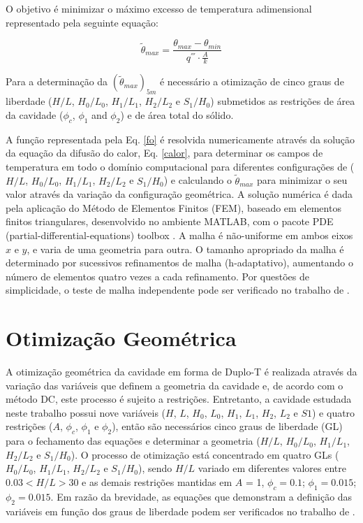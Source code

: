 \documentclass[12pt,A4,A4pt]{article}
\begin{document}
O objetivo é minimizar o máximo excesso de temperatura adimensional representado pela seguinte equação:

\begin{equation}
\tilde{\theta}_{max}=\frac{\theta_{max}-\theta_{min}}{q^{'''}\cdot\frac{A}{k}}\label{fo}
\end{equation}

Para a determinação da $(\tilde{\theta}_{max})_{5m}$ é necessário a otimização de cinco graus de liberdade ($H/L$, $H_{0}/L_{0}$, $H_{1}/L_{1}$, $H_{2}/L_{2}$ e $S_{1}/H_{0}$) submetidos as restrições de área da cavidade ($\phi_{c}$, $\phi_{1}$ and $\phi_{2}$) e de área total do sólido.

A função representada pela Eq. \ref{fo} é resolvida numericamente através da  solução da equação da difusão do calor, Eq. \ref{calor}, para determinar os campos de temperatura em todo o domínio computacional para diferentes configurações de ($H/L$, $H_{0}/L_{0}$, $H_{1}/L_{1}$, $H_{2}/L_{2}$ e $S_{1}/H_{0}$) e calculando o $\tilde{\theta}_{max}$ para minimizar o seu valor através da variação da configuração geométrica. A solução numérica é dada pela aplicação do Método de Elementos Finitos (FEM), baseado em elementos finitos triangulares, desenvolvido no ambiente MATLAB, com o pacote PDE (partial-differential-equations) toolbox \citep{Reddy1994}. A malha é não-uniforme em ambos eixos $x$ e $y$, e varia de uma geometria para outra. O tamanho apropriado da malha é determinado por sucessivos refinamentos de malha (h-adaptativo), aumentando o número de elementos quatro vezes a cada refinamento. Por questões de simplicidade, o teste de malha independente pode ser verificado no trabalho de \cite{Gonzales2015cilamce}.

\section{Otimização Geométrica}
\label{opt}
\hspace{0.5cm}A otimização geométrica da cavidade em forma de Duplo-T é realizada através da variação das variáveis que definem a geometria da cavidade e, de acordo com o método DC, este processo é sujeito a restrições. Entretanto, a cavidade estudada neste trabalho possui nove variáveis ($H$, $L$, $H_{0}$, $L_{0}$, $H_{1}$, $L_{1}$, $H_{2}$, $L_{2}$ e $S1$) e quatro restrições ($A$, $\phi_{c}$, $\phi_{1}$ e $\phi_{2}$), então são necessários cinco graus de liberdade (GL) para o fechamento das equações e determinar a geometria ($H/L$, $H_{0}/L_{0}$, $H_{1}/L_{1}$, $H_{2}/L_{2}$ e $S_{1}/H_{0}$). O processo de otimização está concentrado em quatro GLs ( $H_{0}/L_{0}$, $H_{1}/L_{1}$, $H_{2}/L_{2}$ e $S_{1}/H_{0}$), sendo $H/L$ variado em diferentes valores entre $0.03< H/L >30$ e as demais restrições mantidas em $A$ = 1, $\phi_{c}=0.1$; $\phi_{1} =0.015$; $\phi_{2}=0.015$. Em razão da brevidade, as equações que demonstram a definição das variáveis em função dos graus de liberdade podem ser verificados no trabalho de \cite{Gonzales2015cilamce}.
\end{document}
